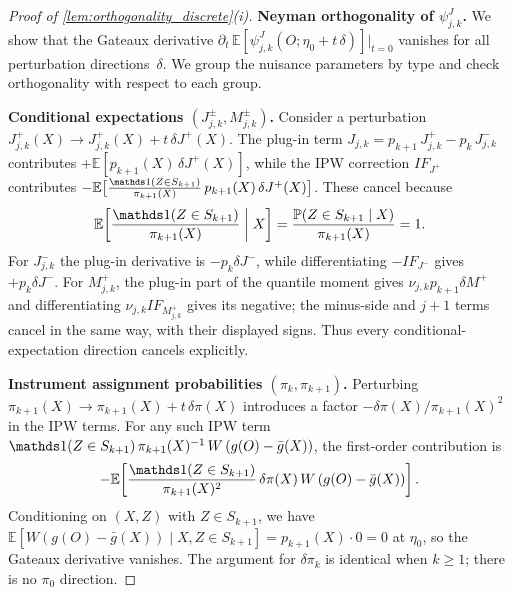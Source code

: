 \begin{proof}[Proof of \cref{lem:orthogonality_discrete}\textup{(i)}]
\medskip
\noindent\textbf{Neyman orthogonality of $\psi_{j,k}^J$.}
We show that the Gateaux derivative $\partial_t\,\mathbb{E}[\psi_{j,k}^J(O;\eta_0 + t\,\delta)]|_{t=0}$ vanishes for all perturbation directions~$\delta$. We group the nuisance parameters by type and check orthogonality with respect to each group.

\textbf{Conditional expectations $(J_{j,k}^\pm, M_{j,k}^\pm)$.}
Consider a perturbation $J_{j,k}^+(X) \to J_{j,k}^+(X) + t\,\delta J^+(X)$. The plug-in term $J_{j,k} = p_{k+1}\,J_{j,k}^+ - p_k\,J_{j,k}^-$ contributes $+\mathbb{E}[p_{k+1}(X)\,\delta J^+(X)]$, while the IPW correction $IF_{J^+}$ contributes $-\mathbb{E}\bigl[\frac{\indicator(Z \in S_{k+1})}{\pi_{k+1}(X)}\,p_{k+1}(X)\,\delta J^+(X)\bigr]$. These cancel because
\[
    \mathbb{E}\!\left[\frac{\indicator(Z \in S_{k+1})}{\pi_{k+1}(X)} \mathrel{\bigg|} X\right] = \frac{\mathbb{P}(Z \in S_{k+1} \mid X)}{\pi_{k+1}(X)} = 1.
\]
For $J_{j,k}^-$ the plug-in derivative is $-p_k\delta J^-$, while differentiating $-IF_{J^-}$ gives $+p_k\delta J^-$. For $M_{j,k}^+$, the plug-in part of the quantile moment gives $\nu_{j,k}p_{k+1}\delta M^+$ and differentiating $\nu_{j,k}IF_{M_{j,k}^+}$ gives its negative; the minus-side and $j+1$ terms cancel in the same way, with their displayed signs. Thus every conditional-expectation direction cancels explicitly.

\textbf{Instrument assignment probabilities $(\pi_k, \pi_{k+1})$.}
Perturbing $\pi_{k+1}(X) \to \pi_{k+1}(X) + t\,\delta\pi(X)$ introduces a factor $-\delta\pi(X)/\pi_{k+1}(X)^2$ in the IPW terms. For any such IPW term $\indicator(Z \in S_{k+1})\,\pi_{k+1}(X)^{-1}\,W\,(g(O) - \bar{g}(X))$, the first-order contribution is
\[
    -\mathbb{E}\!\left[\frac{\indicator(Z \in S_{k+1})}{\pi_{k+1}(X)^2}\,\delta\pi(X)\,W\,(g(O) - \bar{g}(X))\right].
\]
Conditioning on $(X,Z)$ with $Z \in S_{k+1}$, we have $\mathbb{E}[W(g(O) - \bar{g}(X)) \mid X, Z \in S_{k+1}] = p_{k+1}(X) \cdot 0 = 0$ at $\eta_0$, so the Gateaux derivative vanishes. The argument for $\delta\pi_k$ is identical when $k\geqslant1$; there is no $\pi_0$ direction.


\end{proof}
